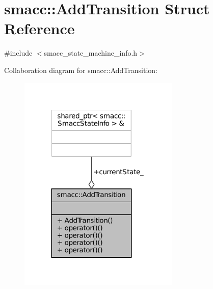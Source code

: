 \hypertarget{structsmacc_1_1AddTransition}{}\section{smacc\+:\+:Add\+Transition Struct Reference}
\label{structsmacc_1_1AddTransition}


{\ttfamily \#include $<$smacc\+\_\+state\+\_\+machine\+\_\+info.\+h$>$}



Collaboration diagram for smacc\+:\+:Add\+Transition\+:
\nopagebreak
\begin{figure}[H]
\begin{center}
\leavevmode
\includegraphics[width=217pt]{structsmacc_1_1AddTransition__coll__graph}
\end{center}
\end{figure}
